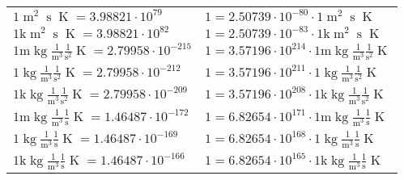 \begin{center}
\begin{longtable}{l l}
{\color{black}$1 \bm{\mathrm{ }}{\operatorname{m}^2}{\operatorname{s}}{}{\operatorname{K}} = 3.98821\cdot10^{79} $}   & {\color{black}$ 1 = 2.50739\cdot10^{-80} \cdot 1 \bm{\mathrm{ }}{\operatorname{m}^2}{\operatorname{s}}{}{\operatorname{K}}$}  \\
{\color{gray}$1 \bm{\mathrm{ k}}{\operatorname{m}^2}{\operatorname{s}}{}{\operatorname{K}} = 3.98821\cdot10^{82} $}   & {\color{gray}$ 1 = 2.50739\cdot10^{-83} \cdot 1 \bm{\mathrm{ k}}{\operatorname{m}^2}{\operatorname{s}}{}{\operatorname{K}}$}  \\
\hline{\color{gray}$1 \bm{\mathrm{ m}}\operatorname{kg}\frac1{\operatorname{m}^3}\frac1{\operatorname{s}^2}{}{\operatorname{K}} = 2.79958\cdot10^{-215} $}   & {\color{gray}$ 1 = 3.57196\cdot10^{214} \cdot 1 \bm{\mathrm{ m}}\operatorname{kg}\frac1{\operatorname{m}^3}\frac1{\operatorname{s}^2}{}{\operatorname{K}}$}  \\
{\color{black}$1 \bm{\mathrm{ }}\operatorname{kg}\frac1{\operatorname{m}^3}\frac1{\operatorname{s}^2}{}{\operatorname{K}} = 2.79958\cdot10^{-212} $}   & {\color{black}$ 1 = 3.57196\cdot10^{211} \cdot 1 \bm{\mathrm{ }}\operatorname{kg}\frac1{\operatorname{m}^3}\frac1{\operatorname{s}^2}{}{\operatorname{K}}$}  \\
{\color{gray}$1 \bm{\mathrm{ k}}\operatorname{kg}\frac1{\operatorname{m}^3}\frac1{\operatorname{s}^2}{}{\operatorname{K}} = 2.79958\cdot10^{-209} $}   & {\color{gray}$ 1 = 3.57196\cdot10^{208} \cdot 1 \bm{\mathrm{ k}}\operatorname{kg}\frac1{\operatorname{m}^3}\frac1{\operatorname{s}^2}{}{\operatorname{K}}$}  \\
{\color{gray}$1 \bm{\mathrm{ m}}\operatorname{kg}\frac1{\operatorname{m}^3}\frac1{\operatorname{s}}{}{\operatorname{K}} = 1.46487\cdot10^{-172} $}   & {\color{gray}$ 1 = 6.82654\cdot10^{171} \cdot 1 \bm{\mathrm{ m}}\operatorname{kg}\frac1{\operatorname{m}^3}\frac1{\operatorname{s}}{}{\operatorname{K}}$}  \\
{\color{black}$1 \bm{\mathrm{ }}\operatorname{kg}\frac1{\operatorname{m}^3}\frac1{\operatorname{s}}{}{\operatorname{K}} = 1.46487\cdot10^{-169} $}   & {\color{black}$ 1 = 6.82654\cdot10^{168} \cdot 1 \bm{\mathrm{ }}\operatorname{kg}\frac1{\operatorname{m}^3}\frac1{\operatorname{s}}{}{\operatorname{K}}$}  \\
{\color{gray}$1 \bm{\mathrm{ k}}\operatorname{kg}\frac1{\operatorname{m}^3}\frac1{\operatorname{s}}{}{\operatorname{K}} = 1.46487\cdot10^{-166} $}   & {\color{gray}$ 1 = 6.82654\cdot10^{165} \cdot 1 \bm{\mathrm{ k}}\operatorname{kg}\frac1{\operatorname{m}^3}\frac1{\operatorname{s}}{}{\operatorname{K}}$}  \\

\end{longtable}
\end{center}

